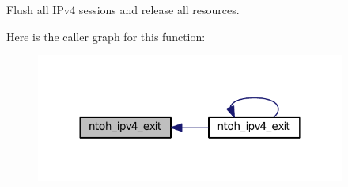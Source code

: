 Flush all I\-Pv4 sessions and release all resources. 



Here is the caller graph for this function\-:
\nopagebreak
\begin{figure}[H]
\begin{center}
\leavevmode
\includegraphics[width=288pt]{namespacelibntoh_ab056e87608725bb280228ed713d379cd_icgraph}
\end{center}
\end{figure}



